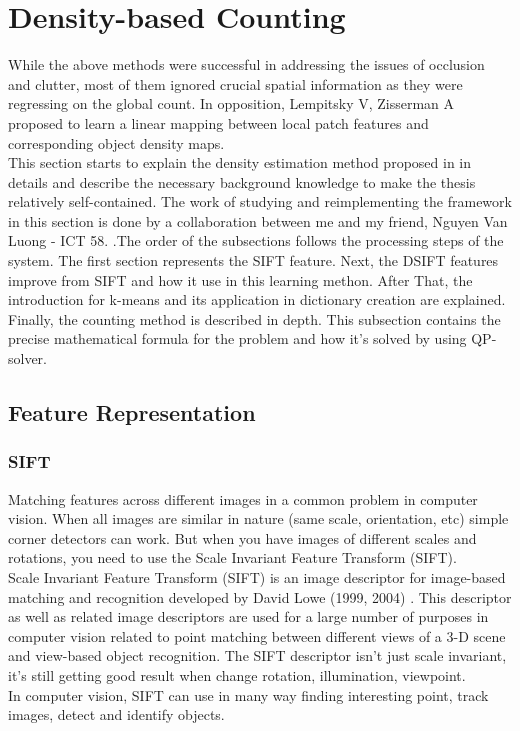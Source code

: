 \section{Density-based Counting}
While the above methods were successful in addressing the issues of occlusion and clutter, most of them ignored crucial spatial information as they were regressing on the global count. In opposition, Lempitsky V, Zisserman A \cite{Lempitsky:Zisserman:Destimate} proposed to learn a linear mapping between local patch features and corresponding object density maps. \\
This section starts to explain the density estimation method proposed in \cite{Lempitsky:Zisserman:Destimate} in details and describe the necessary background knowledge to make the thesis relatively self-contained. The work of studying and reimplementing the framework in this section is done by a collaboration between me and my friend, Nguyen Van Luong - ICT 58.
.The order of the subsections follows the processing steps of the system. The first section represents the SIFT feature. Next, the DSIFT features improve from SIFT and how it use in this learning methon. After That, the introduction for k-means and its application in dictionary creation are explained. Finally, the counting method is described in depth. This subsection contains the precise mathematical formula for the problem and how it’s solved by using QP-solver.
\subsection{Feature Representation}

\subsubsection{SIFT}

Matching features across different images in a common problem in computer vision. When all images are similar in nature (same scale, orientation, etc) simple corner detectors can work. But when you have images of different scales and rotations, you need to use the Scale Invariant Feature Transform (SIFT). \\
Scale Invariant Feature Transform (SIFT) is an image descriptor for image-based matching and recognition developed by David Lowe (1999, 2004) \cite{David:sift}. This descriptor as well as related image descriptors are used for a large number of purposes in computer vision related to point matching between different views of a 3-D scene and view-based object recognition. The SIFT descriptor isn't just scale invariant, it's still getting good result when change rotation, illumination, viewpoint. \\
In computer vision, SIFT can use in many way finding interesting point, track images, detect and identify objects.

